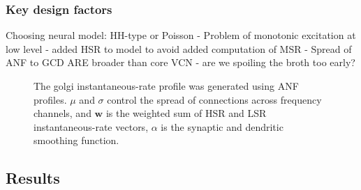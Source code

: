 \subsubsection{Key design factors}

Choosing neural model: HH-type or Poisson
 - Problem of monotonic excitation at low level
  - added HSR to model to avoid added computation of MSR
 - Spread of ANF to GCD ARE broader than core VCN
  - are we spoiling the broth too early? 


\begin{figure}[hp!]
  \centering
  \caption{ The golgi instantaneous-rate profile was generated using ANF
    profiles. $\mu$ and $\sigma$ control the spread of connections
    across frequency channels, and $\mathbf{w}$ is
    the weighted sum of HSR and LSR instantaneous-rate vectors,
    $\alpha$ is the synaptic and dendritic smoothing function.}\label{fig:GolgiDiagram}
\end{figure}

\newpage






\clearpage
\subsection{Results}

